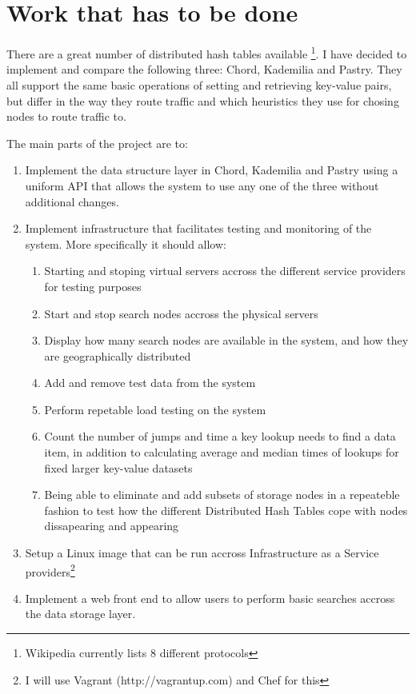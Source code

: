 \section*{Work that has to be done}

There are a great number of distributed hash tables available \footnote{ Wikipedia currently lists 8 different protocols }. I have decided to implement and compare the following three: Chord, Kademilia and Pastry. They all support the same basic operations of setting and retrieving key-value pairs, but differ in the way they route traffic and which heuristics they use for chosing nodes to route traffic to.

The main parts of the project are to:

\begin{enumerate}
  \item Implement the data structure layer in Chord, Kademilia and Pastry using a uniform API that allows the system to use any one of the three without additional changes.
  
  \item Implement infrastructure that facilitates testing and monitoring of the system. More specifically it should allow:

  \begin{enumerate}
    \item Starting and stoping virtual servers accross the different service providers for testing purposes
    \item Start and stop search nodes accross the physical servers
    \item Display how many search nodes are available in the system, and how they are geographically distributed
    \item Add and remove test data from the system
    \item Perform repetable load testing on the system
    \item Count the number of jumps and time a key lookup needs to find a data item, in addition to calculating average and median times of lookups for fixed larger key-value datasets
    \item Being able to eliminate and add subsets of storage nodes in a repeateble fashion to test how the different Distributed Hash Tables cope with nodes dissapearing and appearing
  \end{enumerate}

  \item Setup a Linux image that can be run accross Infrastructure as a Service providers\footnote{I will use Vagrant (http://vagrantup.com) and Chef for this}

  \item Implement a web front end to allow users to perform basic searches accross the data storage layer.

\end{enumerate}

